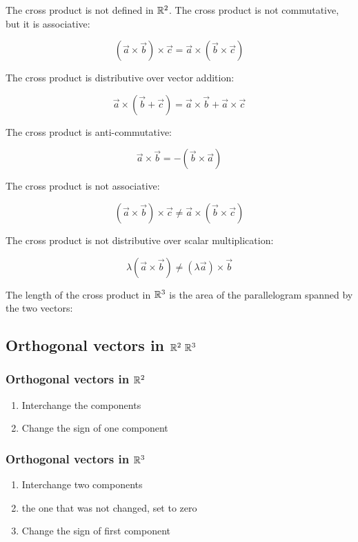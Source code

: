 The cross product is not defined in \(\mathbb{R}^2\).
The cross product is not commutative, but it is associative:

\[
	(\vec{a} \times \vec{b}) \times \vec{c} = \vec{a} \times (\vec{b} \times \vec{c})
\]

The cross product is distributive over vector addition:

\[
	\vec{a} \times (\vec{b} + \vec{c}) = \vec{a} \times \vec{b} + \vec{a} \times \vec{c}
\]

The cross product is anti-commutative:

\[
	\vec{a} \times \vec{b} = -(\vec{b} \times \vec{a})
\]

The cross product is not associative:

\[
	(\vec{a} \times \vec{b}) \times \vec{c} \neq \vec{a} \times (\vec{b} \times \vec{c})
\]

The cross product is not distributive over scalar multiplication:

\[
	\lambda(\vec{a} \times \vec{b}) \neq (\lambda\vec{a}) \times \vec{b}
\]

The length of the cross product in \(\mathbb{R}^3\) is the area of the parallelogram spanned by the two vectors:

\subsection{Orthogonal vectors in \texorpdfstring{\(\mathbb{R}^2\ \mathbb{R}^3\)}{}}

\subsubsection{Orthogonal vectors in \texorpdfstring{\(\mathbb{R}^2\)}{}}

\begin{enumerate}
	\item Interchange the components
	\item Change the sign of one component
\end{enumerate}

\subsubsection{Orthogonal vectors in \texorpdfstring{\(\mathbb{R}^3\)}{}}
\begin{enumerate}
	\item Interchange two components
	\item the one that was not changed, set to zero
	\item Change the sign of first component
\end{enumerate}

